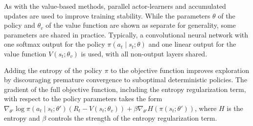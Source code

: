 \documentclass{article}
\begin{document}
As with the value-based methods, parallel actor-learners and accumulated updates are used to improve training stability. While the parameters \(\theta\) of the policy and \(\theta_v\) of the value function are shown as separate for generality, some parameters are shared in practice. Typically, a convolutional neural network with one softmax output for the policy \(\pi(a_t \mid s_t; \theta)\) and one linear output for the value function \(V(s_t; \theta_v)\) is used, with all non-output layers shared.

Adding the entropy of the policy \(\pi\) to the objective function improves exploration by discouraging premature convergence to suboptimal deterministic policies. The gradient of the full objective function, including the entropy regularization term, with respect to the policy parameters takes the form \(\nabla_{\theta'} \log \pi(a_t \mid s_t; \theta') (R_t - V(s_t; \theta_v)) + \beta \nabla_{\theta'} H(\pi(s_t; \theta'))\), where \(H\) is the entropy and \(\beta\) controls the strength of the entropy regularization term.
\end{document}

